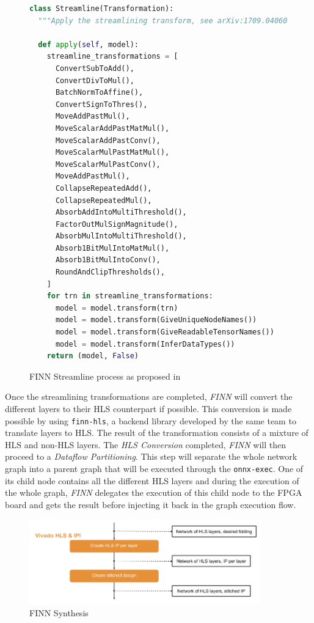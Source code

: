 \begin{figure}[htbp]
\centering
\begin{lstlisting}[language=Python]
class Streamline(Transformation):
  """Apply the streamlining transform, see arXiv:1709.04060."""

  def apply(self, model):
    streamline_transformations = [
      ConvertSubToAdd(),
      ConvertDivToMul(),
      BatchNormToAffine(),
      ConvertSignToThres(),
      MoveAddPastMul(),
      MoveScalarAddPastMatMul(),
      MoveScalarAddPastConv(),
      MoveScalarMulPastMatMul(),
      MoveScalarMulPastConv(),
      MoveAddPastMul(),
      CollapseRepeatedAdd(),
      CollapseRepeatedMul(),
      AbsorbAddIntoMultiThreshold(),
      FactorOutMulSignMagnitude(),
      AbsorbMulIntoMultiThreshold(),
      Absorb1BitMulIntoMatMul(),
      Absorb1BitMulIntoConv(),
      RoundAndClipThresholds(),
    ]
    for trn in streamline_transformations:
      model = model.transform(trn)
      model = model.transform(GiveUniqueNodeNames())
      model = model.transform(GiveReadableTensorNames())
      model = model.transform(InferDataTypes())
    return (model, False)
\end{lstlisting}
\caption[FINN Streamline]{FINN Streamline process as proposed in \cite{Blott2018}}
	\label{fig:FINNStreamline}
\end{figure}


Once the streamlining transformations are completed, \emph{FINN} will convert the different layers to their HLS counterpart if possible. This conversion is made possible by using \texttt{finn-hls}, a backend library developed by the same team to translate layers to HLS. The result of the transformation consists of a mixture of HLS and non-HLS layers. The \emph{HLS Conversion} completed, \emph{FINN} will then proceed to a \emph{Dataflow Partitioning}. This step will separate the whole network graph into a parent graph that will be executed through the \texttt{onnx-exec}. One of its child node contains all the different HLS layers and during the execution of the whole graph, \emph{FINN} delegates the execution of this child node to the FPGA board and gets the result before injecting it back in the graph execution flow.

\begin{figure}[htbp]
	\centering
		\includegraphics[width=10cm]{Figures/FINNSynthesis.png}
	\caption[FINN Synthesis]{FINN Synthesis}
	\label{fig:FINNSynthesis}
\end{figure}

